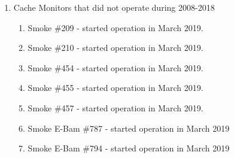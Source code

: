 \begin{enumerate}
\item Cache Monitors that did not operate during 2008-2018
\begin{enumerate}[nolistsep]
\item Smoke \#209 - started operation in March 2019.
\item Smoke \#210 - started operation in March 2019.
\item Smoke \#454 - started operation in March 2019.
\item Smoke \#455 - started operation in March 2019.
\item Smoke \#457 - started operation in March 2019.
\item Smoke E-Bam \#787 - started operation in March 2019
\item Smoke E-Bam \#794 - started operation in March 2019
\end{enumerate}


\end{enumerate}
